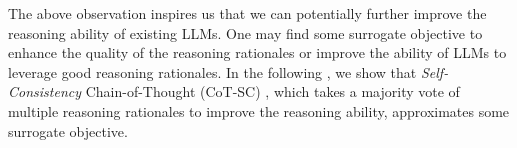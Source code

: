 
The above observation inspires us that we can potentially further improve the reasoning ability of existing LLMs. 
One may find some surrogate objective to enhance the quality of the reasoning rationales or improve the ability of LLMs to leverage good reasoning rationales. 
In the following ,
we show that \textit{Self-Consistency} Chain-of-Thought (CoT-SC) \citep{DBLP:conf/iclr/0002WSLCNCZ23}, which takes a majority vote of multiple reasoning rationales to improve the reasoning ability,
approximates some surrogate objective.



